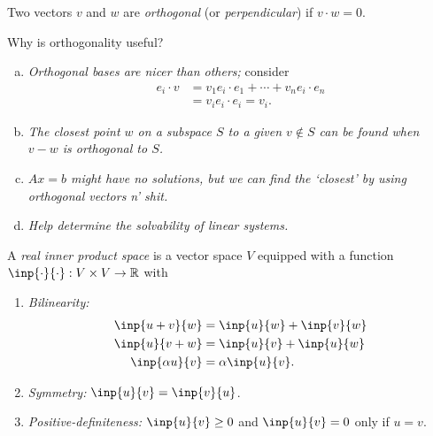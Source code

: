 \begin{definition}
  Two vectors $v$ and $w$ are \emph{orthogonal} (or \emph{perpendicular}) if $v\cdot w = 0$.
\end{definition}


\begin{question}
  Why is orthogonality useful?
\end{question}
\begin{answer}
  \begin{enumerate}[(a)]
    \item \emph{Orthogonal bases are nicer than others;} consider
    \begin{align*}
      e_i\cdot v &= v_1 e_i \cdot e_1 + \cdots + v_n e_i \cdot e_n\\
      &= v_i e_i\cdot e_i = v_i.
    \end{align*}

    \item \emph{The closest point $w$ on a subspace $S$ to a given $v\notin S$ can be found when $v-w$ is orthogonal to $S$.}

    \item \emph{$Ax=b$ might have no solutions, but we can find the `closest' by using orthogonal vectors n' shit.}

    \item \emph{Help determine the solvability of linear systems.}
  \end{enumerate}
\end{answer}


\begin{definition}
  A \emph{real inner product space} is a vector space $V$ equipped with a function $\inp{\cdot}{\cdot}:V\times V\to\bbR$ with
  \begin{enumerate}[(1)]
    \item\emph{Bilinearity:}
    \begin{align*}
      \inp{u+v}{w} &= \inp{u}{w} + \inp{v}{w}\\
      \inp{u}{v+w} &= \inp{u}{v} + \inp{u}{w}\\
      \inp{\alpha u}{v} &= \alpha\inp{u}{v}.
    \end{align*}
    \item\emph{Symmetry:} $\inp{u}{v} = \inp{v}{u}$.
    \item\emph{Positive-definiteness:} $\inp{u}{v}\geq 0$ and $\inp{u}{v}=0$ only if $u=v$.
  \end{enumerate}
\end{definition}


